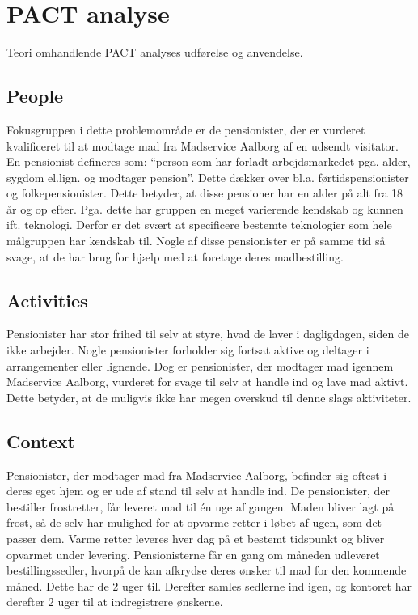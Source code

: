 \section{PACT analyse}
Teori omhandlende PACT analyses udførelse og anvendelse.

\subsection{People}
Fokusgruppen i dette problemområde er de pensionister, der er vurderet kvalificeret til at modtage mad fra Madservice Aalborg af en udsendt visitator.
En pensionist defineres som: ``person som har forladt arbejdsmarkedet pga. alder, sygdom el.lign. og modtager pension''.
Dette dækker over bl.a. førtidspensionister og folkepensionister\cite{ordnet_pensionist}.
Dette betyder, at disse pensioner har en alder på alt fra 18 år og op efter.
Pga. dette har gruppen en meget varierende kendskab og kunnen ift. teknologi.
Derfor er det svært at specificere bestemte teknologier som hele målgruppen har kendskab til.
Nogle af disse pensionister er på samme tid så svage, at de har brug for hjælp med at foretage deres madbestilling.

\subsection{Activities}
Pensionister har stor frihed til selv at styre, hvad de laver i dagligdagen, siden de ikke arbejder.
Nogle pensionister forholder sig fortsat aktive og deltager i arrangementer eller lignende.
Dog er pensionister, der modtager mad igennem Madservice Aalborg, vurderet for svage til selv at handle ind og lave mad aktivt.
Dette betyder, at de muligvis ikke har megen overskud til denne slags aktiviteter.

\subsection{Context}
Pensionister, der modtager mad fra Madservice Aalborg, befinder sig oftest i deres eget hjem og er ude af stand til selv at handle ind. 
De pensionister, der bestiller frostretter, får leveret mad til én uge af gangen.
Maden bliver lagt på frost, så de selv har mulighed for at opvarme retter i løbet af ugen, som det passer dem.
Varme retter leveres hver dag på et bestemt tidspunkt og bliver opvarmet under levering. 
Pensionisterne får en gang om måneden udleveret bestillingssedler, hvorpå de kan afkrydse deres ønsker til mad for den kommende måned.
Dette har de 2 uger til.
Derefter samles sedlerne ind igen, og kontoret har derefter 2 uger til at indregistrere ønskerne.

